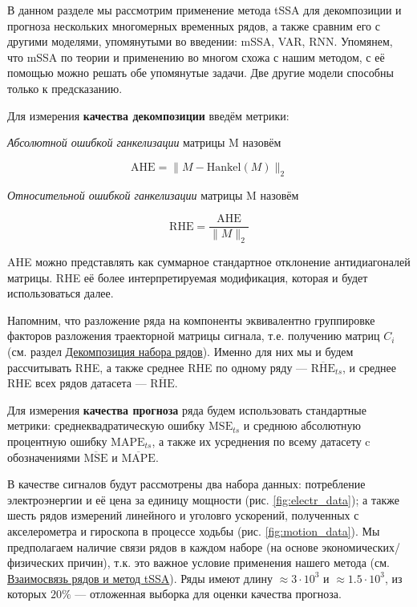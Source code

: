 			В данном разделе мы рассмотрим применение метода tSSA для декомпозиции и прогноза нескольких многомерных временных рядов, а также сравним его с другими моделями, упомянутыми во введении: mSSA, VAR, RNN. Упомянем, что mSSA по теории и применению во многом схожа с нашим методом, с её помощью можно решать обе упомянутые задачи. Две другие модели способны только к предсказанию.
		
			Для измерения \textbf{качества декомпозиции} введём метрики:
			
			\begin{Def}
				\emph{Абсолютной ошибкой ганкелизации} матрицы M назовём 
				
				\[
					\text{AHE} = \lVert M - \text{Hankel}(M) \rVert_2
				\] 
				
			\end{Def}	
			
			\begin{Def}		
				
				\emph{Относительной ошибкой ганкелизации} матрицы M назовём 
				
				\[
				\text{RHE} = \frac{\text{AHE}}{\lVert M \rVert_2} 
				\] 		
				
			\end{Def}
			
			AHE можно представлять как суммарное стандартное отклонение антидиагоналей матрицы. RHE её более интерпретируемая модификация, которая и будет использоваться далее. 
			
			Напомним, что разложение ряда на компоненты эквивалентно группировке факторов разложения траекторной матрицы сигнала, т.е. получению матриц $ C_i $ (см. раздел \hyperref[sec:decomposition]{Декомпозиция набора рядов}). Именно для них мы и будем рассчитывать RHE, а также среднее RHE по одному ряду --- $ \overline{\text{RHE}}_{ts} $, и среднее RHE всех рядов датасета --- $ \overline{\text{RHE}} $.
			
			Для измерения \textbf{качества прогноза} ряда будем использовать стандартные метрики: среднеквадратическую ошибку $ \text{MSE}_{ts} $ и среднюю абсолютную процентную ошибку $ \text{MAPE}_{ts} $, а также их усреднения по всему датасету c обозначениями $ \overline{\text{MSE}} $ и $ \overline{\text{MAPE}} $.
			
			В качестве сигналов будут рассмотрены два набора данных: потребление электроэнергии и её цена за единицу мощности (рис. \ref{fig:electr_data}); а также шесть рядов измерений линейного и уголовго ускорений, полученных с акселерометра и гироскопа в процессе ходьбы (рис. \ref{fig:motion_data}). Мы предполагаем наличие связи рядов в каждом наборе (на основе экономических/физических причин), т.к. это важное условие применения нашего метода (см. \hyperref[sec:tssa_method]{Взаимосвязь рядов и метод tSSA}). Ряды имеют длину $ \approx 3 \cdot 10^3 $ и $ \approx 1.5 \cdot 10^3 $, из которых $ 20\% $ --- отложенная выборка для оценки качества прогноза.

